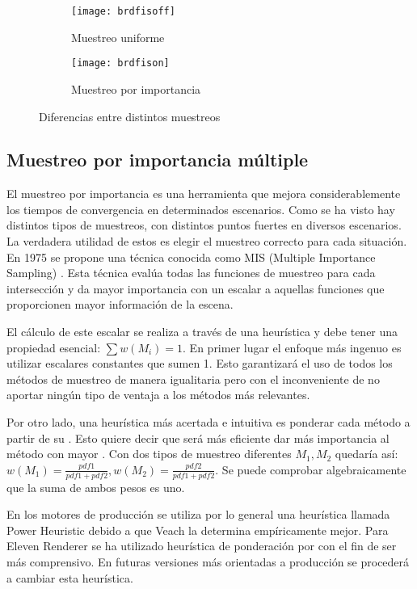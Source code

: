 \begin{figure}[H]
	\label{fig:brdfis}
	\centering
  \begin{subfigure}[b]{0.45\textwidth}
	\texttt{[image: brdfisoff]}
	\caption{Muestreo uniforme}
	\label{fig:brdfisoff}
  \end{subfigure}
  \hfill
  \begin{subfigure}[b]{0.45\textwidth}
	\texttt{[image: brdfison]}
	\caption{Muestreo por importancia}
	\label{fig:brdfison}
  \end{subfigure}
  \caption{Diferencias entre distintos muestreos}
\end{figure}

\subsection{Muestreo por importancia múltiple}

El muestreo por importancia es una herramienta que mejora considerablemente los tiempos de convergencia en determinados escenarios. Como se ha visto hay distintos tipos de muestreos, con distintos puntos fuertes en diversos escenarios. La verdadera utilidad de estos es elegir el muestreo correcto para cada situación. En 1975 se propone una técnica conocida como MIS (Multiple Importance Sampling) \cite{veach1995optimally}. Esta técnica evalúa todas las funciones de muestreo para cada intersección y da mayor importancia con un escalar a aquellas funciones que proporcionen mayor información de la escena.

El cálculo de este escalar se realiza a través de una heurística y debe tener una propiedad esencial: $\sum{w(M_i)} = 1$. En primer lugar el enfoque más ingenuo es utilizar escalares constantes que sumen 1. Esto garantizará el uso de todos los métodos de muestreo de manera igualitaria pero con el inconveniente de no aportar ningún tipo de ventaja a los métodos más relevantes. 

Por otro lado, una heurística más acertada e intuitiva es ponderar cada método a partir de su . Esto quiere decir que será más eficiente dar más importancia al método con mayor . Con dos tipos de muestreo diferentes $M_1, M_2$ quedaría así: $w(M_1) = \frac{pdf1}{pdf1 + pdf2}, w(M_2) = \frac{pdf2}{pdf1 + pdf2}$. Se puede comprobar algebraicamente que la suma de ambos pesos es uno.


En los motores de producción se utiliza por lo general una heurística llamada Power Heuristic debido a que Veach \cite{veach1995optimally} la determina empíricamente mejor. Para Eleven Renderer se ha utilizado heurística de ponderación por  con el fin de ser más comprensivo. En futuras versiones más orientadas a producción se procederá a cambiar esta heurística.

